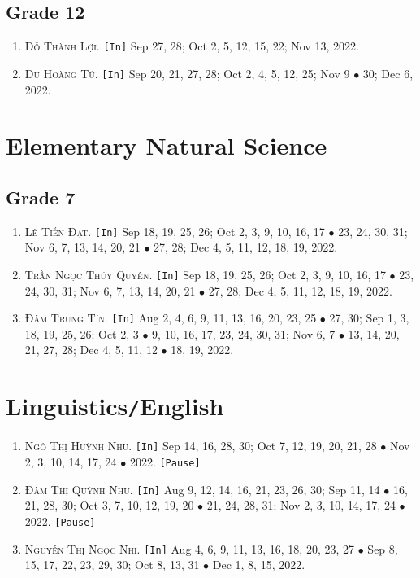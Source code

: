 \documentclass{article}
\numberwithin{equation}{section}
\begin{document}
\subsection{Grade 12}
\begin{enumerate}
	\item \textsc{Đỗ Thành Lợi.} \texttt{[In]} Sep 27, 28; Oct 2, 5, 12, 15, 22; Nov 13, 2022.
	\item \textsc{Du Hoàng Tú.} \texttt{[In]} Sep 20, 21, 27, 28; Oct 2, 4, 5, 12, 25; Nov 9 $\bullet$ 30; Dec 6, 2022.
\end{enumerate}


\section{Elementary Natural Science}

\subsection{Grade 7}
\begin{enumerate}
	\item \textsc{Lê Tiến Đạt.} \texttt{[In]} Sep 18, 19, 25, 26; Oct 2, 3, 9, 10, 16, 17 $\bullet$ 23, 24, 30, 31; Nov 6, 7, 13, 14, 20, \st{21} $\bullet$ 27, 28; Dec 4, 5, 11, 12, 18, 19, 2022.
	\item \textsc{Trần Ngọc Thúy Quyên.} \texttt{[In]} Sep 18, 19, 25, 26; Oct 2, 3, 9, 10, 16, 17 $\bullet$ 23, 24, 30, 31; Nov 6, 7, 13, 14, 20, 21 $\bullet$ 27, 28; Dec 4, 5, 11, 12, 18, 19, 2022.
	\item \textsc{Đàm Trung Tín.} \texttt{[In]} Aug 2, 4, 6, 9, 11, 13, 16, 20, 23, 25 $\bullet$ 27, 30; Sep 1, 3, 18, 19, 25, 26; Oct 2, 3 $\bullet$ 9, 10, 16, 17, 23, 24, 30, 31; Nov 6, 7 $\bullet$ 13, 14, 20, 21, 27, 28; Dec 4, 5, 11, 12 $\bullet$ 18, 19, 2022.
\end{enumerate}


\section{Linguistics\texttt{/}English}
\begin{enumerate}
	\item \textsc{Ngô Thị Huỳnh Như.} \texttt{[In]} Sep 14, 16, 28, 30; Oct 7, 12, 19, 20, 21, 28 $\bullet$ Nov 2, 3, 10, 14, 17, 24 $\bullet$ 2022. \texttt{[Pause]}
	\item \textsc{Đàm Thị Quỳnh Như.} \texttt{[In]} Aug 9, 12, 14, 16, 21, 23, 26, 30; Sep 11, 14 $\bullet$ 16, 21, 28, 30; Oct 3, 7, 10, 12, 19, 20 $\bullet$ 21, 24, 28, 31; Nov 2, 3, 10, 14, 17, 24 $\bullet$ 2022. \texttt{[Pause]}
	\item \textsc{Nguyễn Thị Ngọc Nhi.} \texttt{[In]} Aug 4, 6, 9, 11, 13, 16, 18, 20, 23, 27 $\bullet$ Sep 8, 15, 17, 22, 23, 29, 30; Oct 8, 13, 31 $\bullet$ Dec 1, 8,  15, 2022.
\end{enumerate}


\printbibliography[heading=bibintoc]
	
\end{document}
